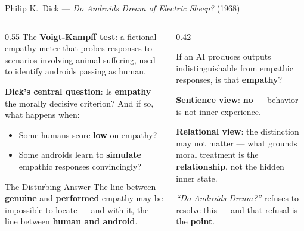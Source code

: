 \documentclass[aspectratio=169,11pt]{beamer}
\begin{document}
\begin{frame}[shrink=5]{Philip K.\ Dick --- \emph{Do Androids Dream of Electric Sheep?} (1968)}
\begin{columns}[T]
\begin{column}{0.55\textwidth}
The \textbf{Voigt-Kampff test}: a fictional empathy meter that probes responses to scenarios involving animal suffering, used to identify androids passing as human.

\vspace{0.2cm}
\textbf{Dick's central question}: Is \textbf{empathy} the morally decisive criterion? And if so, what happens when:
\begin{itemize}
    \item Some humans score \textbf{low} on empathy?
    \item Some androids learn to \textbf{simulate} empathic responses convincingly?
\end{itemize}

\vspace{0.2cm}
\begin{alertblock}{The Disturbing Answer}
\scriptsize
The line between \textbf{genuine} and \textbf{performed} empathy may be impossible to locate --- and with it, the line between \textbf{human and android}.
\end{alertblock}
\end{column}
\begin{column}{0.42\textwidth}
\begin{conceptbox}
\small
If an AI produces outputs indistinguishable from empathic responses, is that \textbf{empathy}?

\vspace{0.15cm}
\textbf{Sentience view}: \textbf{no} --- behavior is not inner experience.

\vspace{0.15cm}
\textbf{Relational view}: the distinction may not matter --- what grounds moral treatment is the \textbf{relationship}, not the hidden inner state.

\vspace{0.15cm}
\textit{``Do Androids Dream?''} refuses to resolve this --- and that refusal is the \textbf{point}.
\end{conceptbox}
\end{column}
\end{columns}
\end{frame}
\end{document}
